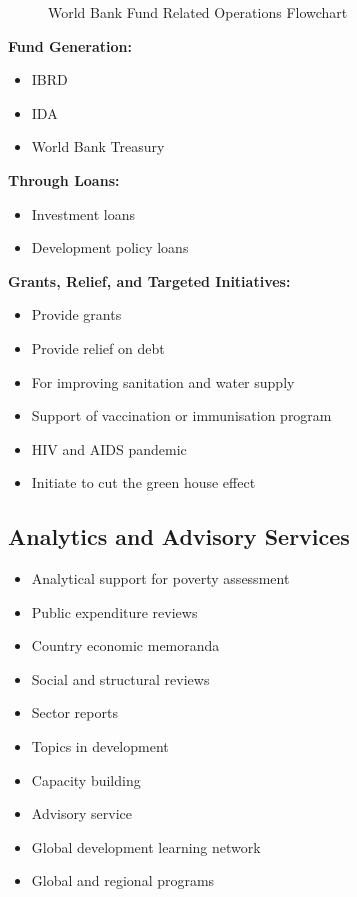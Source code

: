 \begin{figure}[htbp]
{%
    }
    \caption{World Bank Fund Related Operations Flowchart}
    \label{fig:wb_funds_flowchart}
\end{figure}

\noindent\textbf{Fund Generation:}
\begin{itemize}[leftmargin=*]
    \item IBRD
    \item IDA
    \item World Bank Treasury
\end{itemize}

\noindent\textbf{Through Loans:}
\begin{itemize}[leftmargin=*]
    \item Investment loans
    \item Development policy loans
\end{itemize}

\noindent\textbf{Grants, Relief, and Targeted Initiatives:}
\begin{itemize}[leftmargin=*]
    \item Provide grants
    \item Provide relief on debt
    \item For improving sanitation and water supply
    \item Support of vaccination or immunisation program
    \item HIV and AIDS pandemic
    \item Initiate to cut the green house effect
\end{itemize}

\subsection{Analytics and Advisory Services}
\begin{itemize}[leftmargin=*]
    \item Analytical support for poverty assessment
    \item Public expenditure reviews
    \item Country economic memoranda
    \item Social and structural reviews
    \item Sector reports
    \item Topics in development
    \item Capacity building
    \item Advisory service
    \item Global development learning network
    \item Global and regional programs
\end{itemize}

